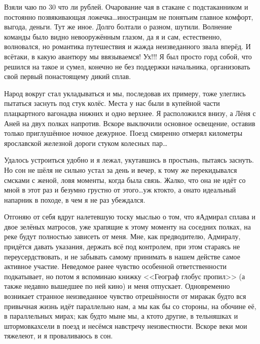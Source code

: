 Взяли чаю по 30 что ли рублей. Очарование чая в стакане с подстаканником и постоянно позвякивающая ложечка\ldots иностранцам не понять\mdash им главное комфорт, выгода, деньги. Тут же иное. Долго болтали о разном, шутили. Волнение команды было видно невооружённым глазом, да я и сам, естественно, волновался, но романтика путешествия и жажда неизведанного звала вперёд. И всё\sdash таки, в какую авантюру мы ввязываемся! Ух!!! Я был просто горд собой, что решился на такое и сумел, конечно не без поддержки начальника, организовать свой первый по\sdash настоящему дикий сплав. 

Народ вокруг стал укладываться и мы, последовав их примеру, тоже улеглись пытаться заснуть под стук колёс. Места у нас были в купейной части плацкартного вагона\mdash два нижних и одно верхнее. Я расположился внизу, а Лёня с Аней на двух полках напротив. Вскоре выключили основное освещение, оставив только приглушённое ночное дежурное. Поезд смиренно отмерял километры ярославской железной дороги стуком колесных пар\ldots

Удалось устроиться удобно и я лежал, укутавшись в простынь, пытаясь заснуть. Но сон не шёл\mdash я не сильно устал за день и вечер, к тому же перекидывался смс\sdash ками с женой, ловя моменты, когда была связь. Жалко, что она не идёт со мной в этот раз и безумно грустно от этого\ldots уж кто\sdash кто, а она\sdash то идеальный напарник в походе, в чем я не раз убеждался.
 
Отгоняю от себя вдруг налетевшую тоску мыслью о том, что я\mdash Адмирал сплава и двое зелёных матросов, уже храпящие к этому моменту на соседних полках, на реке будут полностью зависеть от меня. Мне, как предводителю, Адмиралу, придётся давать указания, держать всё под контролем, при этом стараясь не переусердствовать, и не забывать самому принимать в нашем действе самое активное участие. Неведомое ранее чувство особенной ответственности подкатывает, но потом я вспоминаю книжку <<Географ глобус пропил>> (а также недавно вышедшее по ней кино) и меня отпускает. Одновременно возникает странное неизведанное чувство отрешённости от мира\mdash как будто вся привычная жизнь идёт параллельно нам, а мы как бы со стороны, на обочине её, в параллельных мирах; как будто мы\mdash не мы, а кто\sdash то другие, в тельняшках и штормовках\mdash сели в поезд и несёмся навстречу неизвестности. Вскоре веки мои тяжелеют, и я проваливаюсь в сон.

\begin{center}
\end{center}